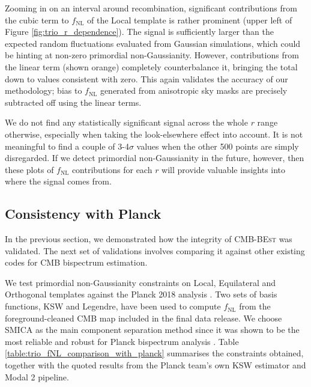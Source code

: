 Zooming in on an interval around recombination, significant contributions from the cubic term to $f_\text{NL}$ of the Local template is rather prominent (upper left of Figure \ref{fig:trio_r_dependence}). The signal is sufficiently larger than the expected random fluctuations evaluated from Gaussian simulations, which could be hinting at non-zero primordial non-Gaussianity. However, contributions from the linear term (shown orange) completely counterbalance it, bringing the total down to values consistent with zero. This again validates the accuracy of our methodology; bias to $f_\text{NL}$ generated from anisotropic sky masks are precisely subtracted off using the linear terms.

We do not find any statistically significant signal across the whole $r$ range otherwise, especially when taking the look-elsewhere effect into account. It is not meaningful to find a couple of 3-4$\sigma$ values when the other 500 points are simply disregarded. If we detect primordial non-Gaussianity in the future, however, then these plots of $f_\text{NL}$ contributions for each $r$ will provide valuable insights into where the signal comes from.



\subsection{Consistency with Planck} \label{section:consistency_with_Planck}

In the previous section, we demonstrated how the integrity of \textsc{CMB-BEst} was validated. The next set of validations involves comparing it against other existing codes for CMB bispectrum estimation.

We test primordial non-Gaussianity constraints on Local, Equilateral and Orthogonal templates against the Planck 2018 analysis \cite{PlanckCollaboration2018}. Two sets of basis functions, KSW and Legendre, have been used to compute $f_\text{NL}$ from the foreground-cleaned CMB map included in the final data release. We choose SMICA as the main component separation method since it was shown to be the most reliable and robust for Planck bispectrum analysis \cite{PlanckCollaboration2013ComponentSeparation, PlanckCollaboration2013,PlanckCollaboration2015,PlanckCollaboration2018}. Table \ref{table:trio_fNL_comparison_with_planck} summarises the constraints obtained, together with the quoted results from the Planck team's own KSW estimator and Modal 2 pipeline.

